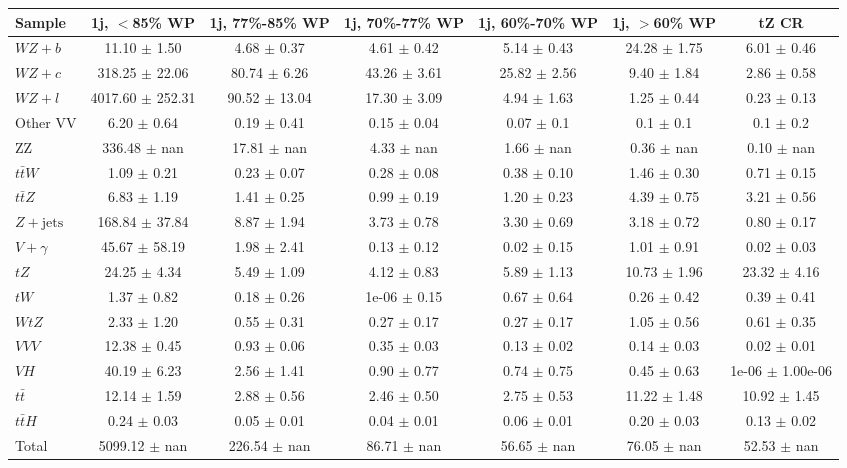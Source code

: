 \begin{tabular}{|l|c|c|c|c|c|c|}
\hline 
Sample & {1j, $<$85\% WP} & {1j, 77\%-85\% WP} & {1j, 70\%-77\% WP} & {1j, 60\%-70\% WP} & {1j, $>$60\% WP} & {tZ CR}\\
\hline 
  $WZ + b$   & 11.10 $\pm$ 1.50 & 4.68 $\pm$ 0.37 & 4.61 $\pm$ 0.42 & 5.14 $\pm$ 0.43 & 24.28 $\pm$ 1.75 & 6.01 $\pm$ 0.46 \\ 
  $WZ + c$   & 318.25 $\pm$ 22.06 & 80.74 $\pm$ 6.26 & 43.26 $\pm$ 3.61 & 25.82 $\pm$ 2.56 & 9.40 $\pm$ 1.84 & 2.86 $\pm$ 0.58 \\ 
  $WZ + l$   & 4017.60 $\pm$ 252.31 & 90.52 $\pm$ 13.04 & 17.30 $\pm$ 3.09 & 4.94 $\pm$ 1.63 & 1.25 $\pm$ 0.44 & 0.23 $\pm$ 0.13 \\ 
  Other VV   & 6.20 $\pm$ 0.64 & 0.19 $\pm$ 0.41 & 0.15 $\pm$ 0.04 & 0.07 $\pm$ 0.1 & 0.1 $\pm$ 0.1 & 0.1 $\pm$ 0.2 \\ 
  ZZ   & 336.48 $\pm$ nan & 17.81 $\pm$ nan & 4.33 $\pm$ nan & 1.66 $\pm$ nan & 0.36 $\pm$ nan & 0.10 $\pm$ nan \\ 
  $t\bar{t}W$   & 1.09 $\pm$ 0.21 & 0.23 $\pm$ 0.07 & 0.28 $\pm$ 0.08 & 0.38 $\pm$ 0.10 & 1.46 $\pm$ 0.30 & 0.71 $\pm$ 0.15 \\ 
  $t\bar{t}Z$   & 6.83 $\pm$ 1.19 & 1.41 $\pm$ 0.25 & 0.99 $\pm$ 0.19 & 1.20 $\pm$ 0.23 & 4.39 $\pm$ 0.75 & 3.21 $\pm$ 0.56 \\ 
   $Z+\text{jets}$   & 168.84 $\pm$ 37.84 & 8.87 $\pm$ 1.94 & 3.73 $\pm$ 0.78 & 3.30 $\pm$ 0.69 & 3.18 $\pm$ 0.72 & 0.80 $\pm$ 0.17 \\ 
   $V+\gamma$   & 45.67 $\pm$ 58.19 & 1.98 $\pm$ 2.41 & 0.13 $\pm$ 0.12 & 0.02 $\pm$ 0.15 & 1.01 $\pm$ 0.91 & 0.02 $\pm$ 0.03 \\ 
  $tZ$   & 24.25 $\pm$ 4.34 & 5.49 $\pm$ 1.09 & 4.12 $\pm$ 0.83 & 5.89 $\pm$ 1.13 & 10.73 $\pm$ 1.96 & 23.32 $\pm$ 4.16 \\ 
  $tW$   & 1.37 $\pm$ 0.82 & 0.18 $\pm$ 0.26 & 1e-06 $\pm$ 0.15 & 0.67 $\pm$ 0.64 & 0.26 $\pm$ 0.42 & 0.39 $\pm$ 0.41 \\ 
  $WtZ$   & 2.33 $\pm$ 1.20 & 0.55 $\pm$ 0.31 & 0.27 $\pm$ 0.17 & 0.27 $\pm$ 0.17 & 1.05 $\pm$ 0.56 & 0.61 $\pm$ 0.35 \\ 
  $VVV$   & 12.38 $\pm$ 0.45 & 0.93 $\pm$ 0.06 & 0.35 $\pm$ 0.03 & 0.13 $\pm$ 0.02 & 0.14 $\pm$ 0.03 & 0.02 $\pm$ 0.01 \\ 
  $VH$   & 40.19 $\pm$ 6.23 & 2.56 $\pm$ 1.41 & 0.90 $\pm$ 0.77 & 0.74 $\pm$ 0.75 & 0.45 $\pm$ 0.63 & 1e-06 $\pm$ 1.00e-06 \\ 
   $t\bar{t}$   & 12.14 $\pm$ 1.59 & 2.88 $\pm$ 0.56 & 2.46 $\pm$ 0.50 & 2.75 $\pm$ 0.53 & 11.22 $\pm$ 1.48 & 10.92 $\pm$ 1.45 \\ 
  $t\bar{t}H$   & 0.24 $\pm$ 0.03 & 0.05 $\pm$ 0.01 & 0.04 $\pm$ 0.01 & 0.06 $\pm$ 0.01 & 0.20 $\pm$ 0.03 & 0.13 $\pm$ 0.02 \\ 
\hline 
  Total  & 5099.12 $\pm$ nan & 226.54 $\pm$ nan & 86.71 $\pm$ nan & 56.65 $\pm$ nan & 76.05 $\pm$ nan & 52.53 $\pm$ nan \\ 
\hline 
\end{tabular} 

